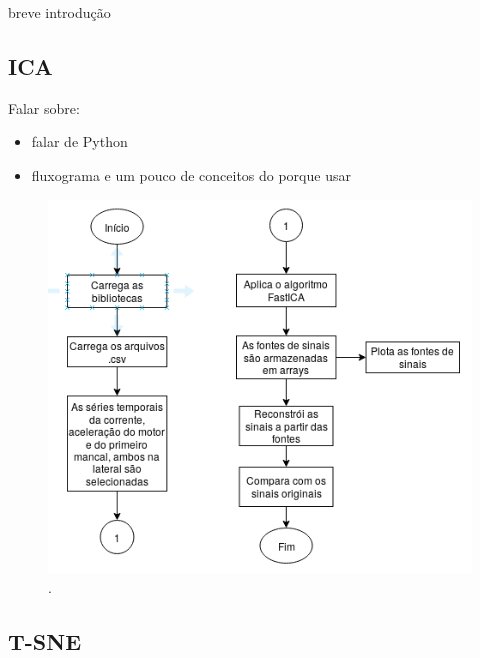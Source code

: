 {breve introdução}

%  

\subsection{ICA}

Falar sobre: 
\begin{itemize}
    \item falar de Python
    \item fluxograma e um pouco de conceitos do porque usar
\end{itemize}

\begin{figure}[H]
    \caption{.}
    \begin{center}
        \includegraphics[scale=.65]{metodologia/img/ica.png}
    \end{center}
    \label{fig:}
\end{figure}

%  

\subsection{T-SNE}

